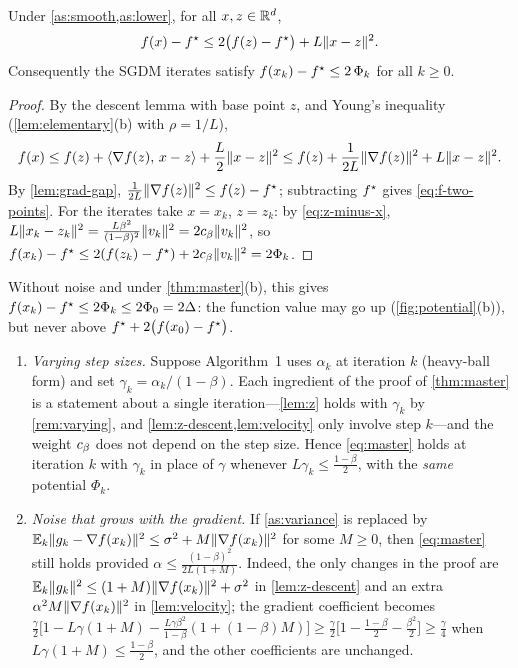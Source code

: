 \begin{lemma}\label{lem:phi-controls-f}
Under \cref{as:smooth,as:lower}, for all $x,z\in\mathbb{R}^d$,
\begin{equation}\label{eq:f-two-points}
  f(x)-f^\star\le2\bigl(f(z)-f^\star\bigr)+L\lVert x-z\rVert^2 .
\end{equation}
Consequently the SGDM iterates satisfy $f(x_k)-f^\star\le2\,\Phi_k$ for all $k\ge0$.
\end{lemma}

\begin{proof}
By the descent lemma with base point $z$, and Young's inequality
(\cref{lem:elementary}(b) with $\rho=1/L$),
\[
  f(x)\le f(z)+\langle \nabla f(z),\, x-z\rangle+\frac L2\lVert x-z\rVert^2
  \le f(z)+\frac{1}{2L}\lVert \nabla f(z)\rVert^2+L\lVert x-z\rVert^2 .
\]
By \cref{lem:grad-gap}, $\frac1{2L}\lVert \nabla f(z)\rVert^2\le f(z)-f^\star$; subtracting $f^\star$
gives \eqref{eq:f-two-points}. For the iterates take $x=x_k$, $z=z_k$: by
\eqref{eq:z-minus-x}, $L\lVert x_k-z_k\rVert^2=\frac{L\beta^2}{(1-\beta)^2}\lVert v_k\rVert^2=2c_\beta\lVert v_k\rVert^2$,
so $f(x_k)-f^\star\le2(f(z_k)-f^\star)+2c_\beta\lVert v_k\rVert^2=2\Phi_k$.
\end{proof}

Without noise and under \cref{thm:master}(b), this gives $f(x_k)-f^\star\le2\Phi_k\le2\Phi_0=2\Delta$:
the function value may go up (\cref{fig:potential}(b)), but never above
$f^\star+2\bigl(f(x_0)-f^\star\bigr)$.

\begin{remark}\label{rem:extensions}
\begin{enumerate}[label=\textup{(\roman*)},leftmargin=2em]
\item \emph{Varying step sizes.} Suppose Algorithm~1 uses $\alpha_k$ at iteration $k$
  (heavy-ball form) and set $\gamma_k=\alpha_k/(1-\beta)$. Each ingredient of the proof of
  \cref{thm:master} is a statement about a single iteration---\cref{lem:z} holds with
  $\gamma_k$ by \cref{rem:varying}, and \cref{lem:z-descent,lem:velocity} only involve
  step $k$---and the weight $c_\beta$ does not depend on the step size. Hence
  \eqref{eq:master} holds at iteration $k$ with $\gamma_k$ in place of $\gamma$ whenever
  $L\gamma_k\le\frac{1-\beta}{2}$, with the \emph{same} potential $\Phi_k$.
\item \emph{Noise that grows with the gradient.} If \cref{as:variance} is replaced by
  $\mathbb{E}_k\lVert g_k-\nabla f(x_k)\rVert^2\le\sigma^2+M\lVert \nabla f(x_k)\rVert^2$ for some $M\ge0$, then
  \eqref{eq:master} still holds provided $\alpha\le\frac{(1-\beta)^2}{2L(1+M)}$. Indeed,
  the only changes in the proof are $\mathbb{E}_k\lVert g_k\rVert^2\le(1+M)\lVert \nabla f(x_k)\rVert^2+\sigma^2$
  in \cref{lem:z-descent} and an extra $\alpha^2M\lVert \nabla f(x_k)\rVert^2$ in
  \cref{lem:velocity}; the gradient coefficient becomes
  $\frac\gamma2\bigl[1-L\gamma(1+M)-\frac{L\gamma\beta^2}{1-\beta}(1+(1-\beta)M)\bigr]
  \ge\frac\gamma2\bigl[1-\frac{1-\beta}{2}-\frac{\beta^2}{2}\bigr]\ge\frac\gamma4$ when
  $L\gamma(1+M)\le\frac{1-\beta}{2}$, and the other coefficients are unchanged.
\end{enumerate}
\end{remark}
